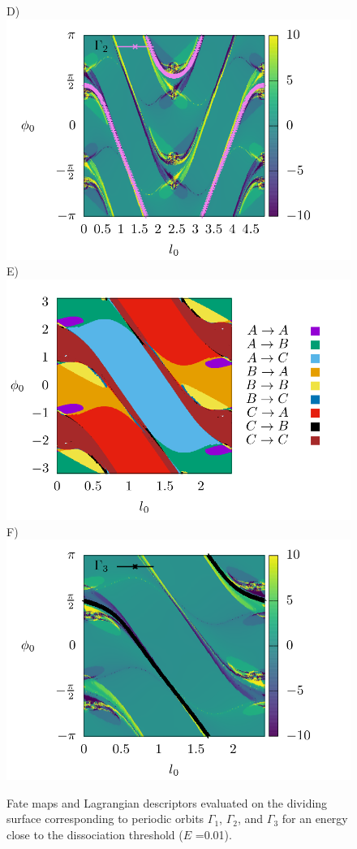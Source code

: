 \documentclass[10pt,aps,onecolumn,superscriptaddress]{revtex4-2}
\begin{document}
\begin{figure}[htbp]
	D)\includegraphics[scale=0.35]{ld_action_ds_gamma2_E_001.png}
	E)\includegraphics[scale=0.35]{fate_map_ds_gamma3E_001.png}
	F)\includegraphics[scale=0.35]{ld_action_ds_gamma3_E_001.png}
	\caption{ Fate maps and Lagrangian descriptors evaluated on the dividing surface corresponding to periodic orbits $\Gamma_1$, $\Gamma_2$, and $\Gamma_3$ for an energy close to the dissociation threshold ($E$ =0.01). }
	\label{fig:ld_fm_ds_E_001}
\end{figure}
\end{document}
